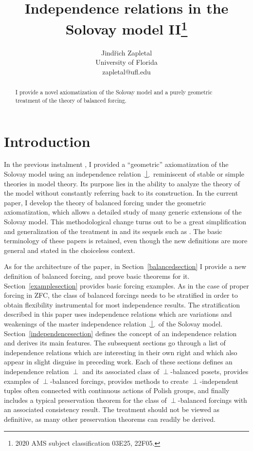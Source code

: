 \documentclass{article}
\title{Independence relations in the Solovay model II\footnote{2020 AMS subject classification 03E25, 22F05.}}
\author{
Jind{\v r}ich Zapletal\\
University of Florida\\
zapletal@ufl.edu}
\newcommand{\forkindep}[1][]{%
  \mathrel{
    \mathop{
      \vcenter{
        \hbox{\oalign{\noalign{\kern-.3ex}\hfil$\vert$\hfil\cr
              \noalign{\kern-.7ex}
              $\smile$\cr\noalign{\kern-.3ex}}}
      }
    }\displaylimits_{#1}
  }
}
\theoremstyle{definition}
\begin{document}
\maketitle


\begin{abstract}
I provide a novel axiomatization of the Solovay model and a purely geometric treatment of the theory of balanced forcing.
\end{abstract}

\section{Introduction}

\noindent In the previous instalment \cite{z:reloadedA}, I provided a ``geometric'' axiomatization of the Solovay model using an independence relation $\forkindep$ reminiscent of stable or simple theories in model theory. Its purpose lies in the ability to analyze the theory of the model without constantly referring back to its construction. In the current paper, I develop the theory of balanced forcing under the geometric axiomatization, which allows a detailed study of many generic extensions of the Solovay model. This methodological change turns out to be a great simplification and generalization of the treatment in \cite{z:geometric} and its sequels such as 
\cite{z:vitali, z:triangles, z:distance, z:ngraphs}. The basic terminology of these papers is retained, even though the new definitions are more general and stated in the choiceless context. 

As for the architecture of the paper, in Section~\ref{balancedsection} I provide a new definition of balanced forcing, and prove basic theorems for it. Section~\ref{examplesection} provides basic forcing examples. As in the case of proper forcing in ZFC, the class of balanced forcings needs to be stratified in order to obtain flexibility instrumental for most independence results. The stratification described in this paper uses independence relations which are variations and weakenings of the master independence relation $\forkindep$ of the Solovay model. Section~\ref{independencesection} defines the concept of an independence relation and derives its main features. The subsequent sections go through a list of independence relations which are interesting in their own right and which also appear in slight disguise in preceding work. Each of these sections defines an independence relation $\perp$ and its associated class of $\perp$-balanced posets, provides examples of $\perp$-balanced forcings, provides methods to create $\perp$-independent tuples often connected with continuous actions of Polish groups, and finally includes a typical preservation theorem for the class of $\perp$-balanced forcings with an associated consistency result. The treatment should not be viewed as definitive, as many other preservation theorems can readily be derived.
\end{document}

